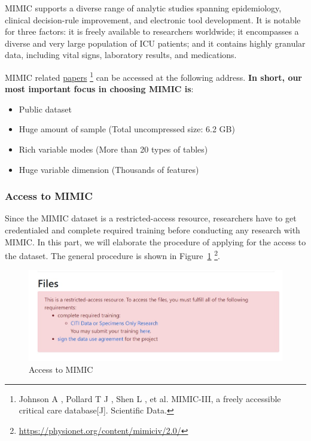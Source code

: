 MIMIC supports a diverse range of analytic studies spanning epidemiology, clinical decision-rule improvement, and electronic tool development. It is notable for three factors: it is freely available to researchers worldwide; it encompasses a diverse and very large population of ICU patients; and it contains highly granular data, including vital signs, laboratory results, and medications.

MIMIC related \href{https://www.nature.com/articles/sdata201635.pdf}{papers} \footnote{Johnson A , Pollard T J , Shen L , et al. MIMIC-III, a freely accessible critical care database[J]. Scientific Data.} can be accessed at the following address.
\textbf {In short, our most important focus in choosing MIMIC is}:
\begin{itemize}
\item Public dataset
\item Huge amount of sample (Total uncompressed size: 6.2 GB)
\item Rich variable modes (More than 20 types of tables)
\item Huge variable dimension (Thousands of features)
\end{itemize}

\subsubsection{Access to MIMIC}
Since the MIMIC dataset is a restricted-access resource, researchers have to get credentialed and complete required training before conducting any research with MIMIC. 
In this part, we will elaborate the procedure of applying for the access to the dataset.
The general procedure is shown in Figure~\ref{fig:Files} \footnote{ \url{https://physionet.org/content/mimiciv/2.0/}}.


\begin{figure}[ht]
    \centering
    \includegraphics[scale=0.7]{images/Files.jpg}
    \caption{Access to MIMIC}
    \label{fig:Files}
\end{figure}

